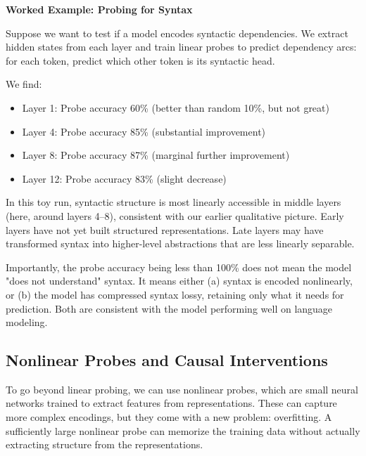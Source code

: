 \begin{examplebox}
\textbf{Worked Example: Probing for Syntax}

Suppose we want to test if a model encodes syntactic dependencies. We extract hidden states from each layer and train linear probes to predict dependency arcs: for each token, predict which other token is its syntactic head.

\vspace{0.5em}

We find:
\begin{itemize}
\item Layer 1: Probe accuracy 60\% (better than random 10\%, but not great)
\item Layer 4: Probe accuracy 85\% (substantial improvement)
\item Layer 8: Probe accuracy 87\% (marginal further improvement)
\item Layer 12: Probe accuracy 83\% (slight decrease)
\end{itemize}

\vspace{0.5em}

In this toy run, syntactic structure is most linearly accessible in middle layers (here, around layers 4--8), consistent with our earlier qualitative picture. Early layers have not yet built structured representations. Late layers may have transformed syntax into higher-level abstractions that are less linearly separable.

\vspace{0.5em}

Importantly, the probe accuracy being less than 100\% does not mean the model "does not understand" syntax. It means either (a) syntax is encoded nonlinearly, or (b) the model has compressed syntax lossy, retaining only what it needs for prediction. Both are consistent with the model performing well on language modeling.
\end{examplebox}

\vspace{1.5em}


\vspace{1.5em}

\subsection{Nonlinear Probes and Causal Interventions}

To go beyond linear probing, we can use nonlinear probes, which are small neural networks trained to extract features from representations. These can capture more complex encodings, but they come with a new problem: overfitting. A sufficiently large nonlinear probe can memorize the training data without actually extracting structure from the representations.

